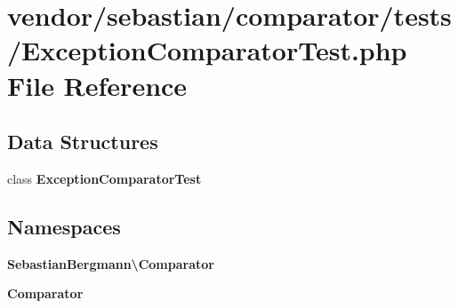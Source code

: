 \section{vendor/sebastian/comparator/tests/\+Exception\+Comparator\+Test.php File Reference}
\label{_exception_comparator_test_8php}
\subsection*{Data Structures}
\begin{DoxyCompactItemize}
\item 
class {\bf Exception\+Comparator\+Test}
\end{DoxyCompactItemize}
\subsection*{Namespaces}
\begin{DoxyCompactItemize}
\item 
 {\bf Sebastian\+Bergmann\textbackslash{}\+Comparator}
\item 
 {\bf Comparator}
\end{DoxyCompactItemize}
